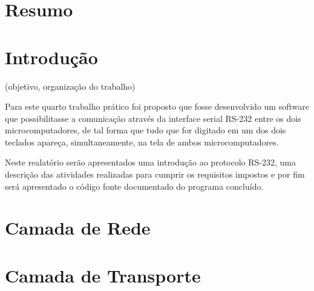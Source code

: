 \documentclass[brazil,times,12pt]{abnt}
\begin{document}





\data{\today}

\capa

\folhaderosto

\section*{Resumo}
	
\section*{Introdução}
(objetivo, organização do trabalho)

	Para este quarto trabalho prático foi proposto que fosse desenvolvido um
	software que possibilitasse a comunicação através da interface serial RS-232
	entre os dois microcomputadores, de tal forma que tudo que for digitado em um
	dos dois teclados apareça, simultaneamente, na tela de ambos microcomputadores.
	
	Neste realatório serão apresentados uma introdução ao protocolo RS-232, uma
	descrição das atividades realizadas para cumprir os requisitos impostos e por
	fim será apresentado o código fonte documentado do programa concluído.

\section*{Camada de Rede}

\section*{Camada de Transporte}
\end{document}
